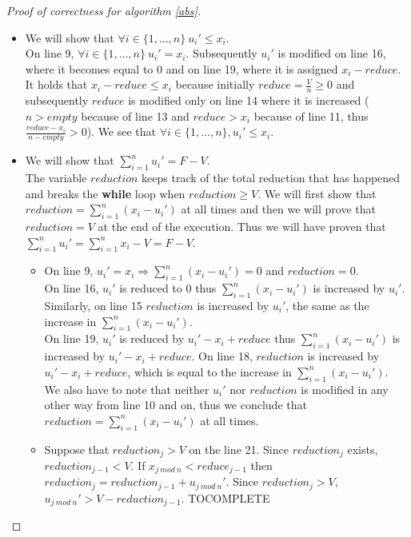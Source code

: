 \documentclass[11pt]{article}
\theoremstyle{definition}
\theoremstyle{corollary}
\begin{document}
    \begin{proof}[Proof of correctness for algorithm \ref{abs}] \
       \begin{itemize}
          \item We will show that $\forall i \in \{1,...,n\} \: u_i' \leq x_i$. \\
          On line 9, $\forall i \in \{1,...,n\} \: u_i' = x_i$. Subsequently $u_i'$ is modified on line 16, where
          it becomes equal to 0 and on line 19, where it is assigned $x_i - reduce$. It holds that $x_i - reduce \leq x_i$
          because initially $reduce = \frac{V}{n} \geq 0$ and subsequently $reduce$ is modified only on line 14 where it
          is increased ($n > empty$ because of line 13 and $reduce > x_i$ because of line 11, thus
          $\frac{reduce - x_i}{n - empty} > 0$). We see that $\forall i \in \{1,...,n\}, u_i' \leq x_i$.
          \item We will show that $\sum\limits_{i=1}^{n}u_i' = F - V$. \\
          The variable $reduction$ keeps track of the total reduction that has happened and breaks the \textbf{while} loop
          when $reduction \geq V$. We will first show that $reduction = \sum\limits_{i=1}^{n}(x_i- u_i')$ at all times and
          then we will prove that $reduction = V$ at the end of the execution. Thus we will have proven that
          $\sum\limits_{i=1}^{n}u_i'= \sum\limits_{i=1}^{n}x_i - V = F - V$.
          \begin{itemize}
             \item On line 9, $u_i' = x_i \Rightarrow \sum\limits_{i=1}^{n}(x_i- u_i') = 0$ and $reduction = 0$. \\
             On line 16, $u_i'$ is reduced to 0 thus $\sum\limits_{i=1}^{n}(x_i- u_i')$ is increased by $u_i'$.
             Similarly, on line 15 $reduction$ is increased by $u_i'$, the same as the increase in
             $\sum\limits_{i=1}^{n}(x_i- u_i')$. \\
             On line 19, $u_i'$ is reduced by $u_i' - x_i + reduce$ thus $\sum\limits_{i=1}^{n}(x_i- u_i')$ is increased
             by $u_i' - x_i + reduce$. On line 18, $reduction$ is increased by $u_i' - x_i + reduce$, which is equal
             to the increase in $\sum\limits_{i=1}^{n}(x_i- u_i')$. \\
             We also have to note that neither $u_i'$ nor $reduction$ is modified in any other way from line 10 and on,
             thus we conclude that $reduction = \sum\limits_{i=1}^{n}(x_i- u_i')$ at all times.
             \item Suppose that $reduction_j > V$ on the line 21. Since $reduction_j$ exists, $reduction_{j-1} < V$.
             If $x_{j \: mod \: n} < reduce_{j-1}$ then $reduction_j = reduction_{j-1} + u_{j \: mod \:n}'$.
             Since $reduction_j > V$, $u_{j \: mod \:n}' > V - reduction_{j-1}$. TOCOMPLETE\\
             
          \end{itemize}
       \end{itemize}
    \end{proof}
\end{document}
